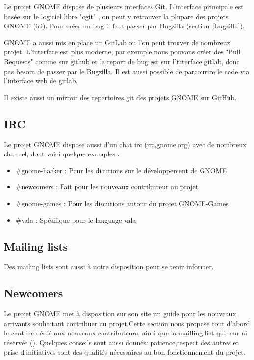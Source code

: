 \documentclass[12pt]{report}
\begin{document}
\label{cgit}
Le projet GNOME dispose de plusieurs interfaces Git. L'interface 
principale est basée sur le logiciel libre "cgit"
, on peut y retrouver la plupare des projets GNOME 
(\href{https://git.gnome.org/}{ici}). Pour créer un bug il faut passer par Bugzilla
(section~\ref{bugzilla}).

\label{gitlab}
GNOME a aussi mis en place un \href{https://gitlab.gnome.org/GNOME}{GitLab} 
ou l'on peut trouver de nombreux projet. L'interface est plus moderne,
par exemple nous pouvons créer des "Pull Requests" comme sur github
et le report de bug est sur l'interface gitlab, donc pas besoin de passer
par le Bugzilla. Il est aussi possible de parcourire le code via l'interface
web de gitlab.

\label{github}
Il existe aussi un mirroir des repertoires git des projets 
\href{https://github.com/GNOME}{GNOME sur GitHub}.

\subsection{IRC}
Le projet GNOME dispose aussi d'un chat irc (\href{irc.gnome.org}{irc.gnome.org})
avec de nombreux channel, dont voici quelque examples :
\begin{itemize}
\item \#gnome-hacker : Pour les dicutions sur le développement de GNOME
\item \#newcomers : Fait pour les nouveaux contributeur au projet
\item \#gnome-games : Pour les discutions autour du projet GNOME-Games
\item \#vala : Spésifique pour le language vala
\end{itemize}

\subsection{Mailing lists}
Des mailing lists sont aussi à notre disposition pour se tenir informer.

\subsection{Newcomers}
Le projet GNOME met à disposition sur son site un guide pour les nouveaux
arrivants souhaitant contribuer au projet.Cette section nous propose
tout d'abord le chat irc dédié aux nouveaux contributeurs, ainsi que la
mailling list qui leur ai réservée
(\href{https://mail.gnome.org/mailman/listinfo/newscomers-list}).
Quelques conseils sont aussi donnés: patience,respect des autres et prise
d'initiatives sont des qualités nécessaires au bon fonctionnement du projet.
\end{document}
